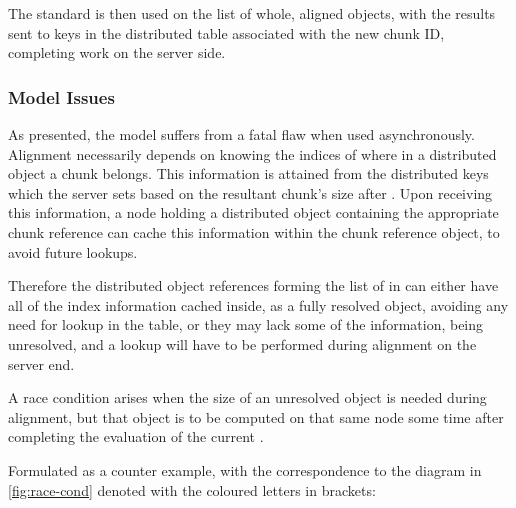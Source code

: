 The standard  is then used on the list of whole,
aligned objects, with the results sent to keys in the distributed table
associated with the new chunk ID, completing work on the server side.

\subsubsection{Model Issues}

As presented, the model suffers from a fatal flaw when used asynchronously.
Alignment necessarily depends on knowing the indices of where in a distributed
object a chunk belongs.
This information is attained from the distributed keys which the server sets
based on the resultant chunk's size after .
Upon receiving this information, a node holding a distributed object containing
the appropriate chunk reference can cache this information within the chunk
reference object, to avoid future lookups.

Therefore the distributed object references forming the list of 
in  can either have all of the index
information cached inside, as a fully resolved object, avoiding any need for
lookup in the table, or they may lack some of the information, being
unresolved, and a lookup will have to be performed during alignment on the
server end.

A race condition arises when the size of an unresolved object is needed during
alignment, but that object is to be computed on that same node some time after
completing the evaluation of the current . 


Formulated as a counter example, with the correspondence to the diagram in
\cref{fig:race-cond} denoted with the coloured letters in brackets:

